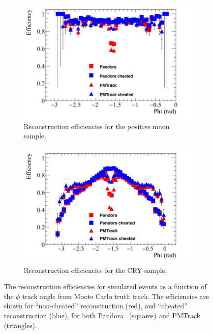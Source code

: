 \begin{figure}
  \centering
  \begin{subfigure}{0.48\textwidth}
    \centering
    \includegraphics[width=\textwidth]{Effic_AntiMuon_500V_All_Phi}
    \caption{Reconstruction efficiencies for the positive muon sample.}
    \label{fig:SimEffic_Phi_AMu}
  \end{subfigure}%
  \hspace{0.03\textwidth}%
  \begin{subfigure}{0.48\textwidth}
    \centering
    \includegraphics[width=\textwidth]{Effic_Cosmics_500V_All_Phi}
    \caption{Reconstruction efficiencies for the CRY sample.}
    \label{fig:SimEffic_Phi_CRY}
  \end{subfigure}
  \caption[The reconstruction efficiencies for simulated events as a function of the $\phi$ track angle from Monte Carlo truth track.]
          {The reconstruction efficiencies for simulated events as a function of the $\phi$ track angle from Monte Carlo truth track. The efficiencies are shown for ``non-cheated'' reconstruction (red), and ``cheated'' reconstruction (blue), for both Pandora~\citep{Pandora} (squares) and PMTrack~\citep{PMTrack} (triangles).}
          \label{fig:SimEffic_Phi}
\end{figure}

